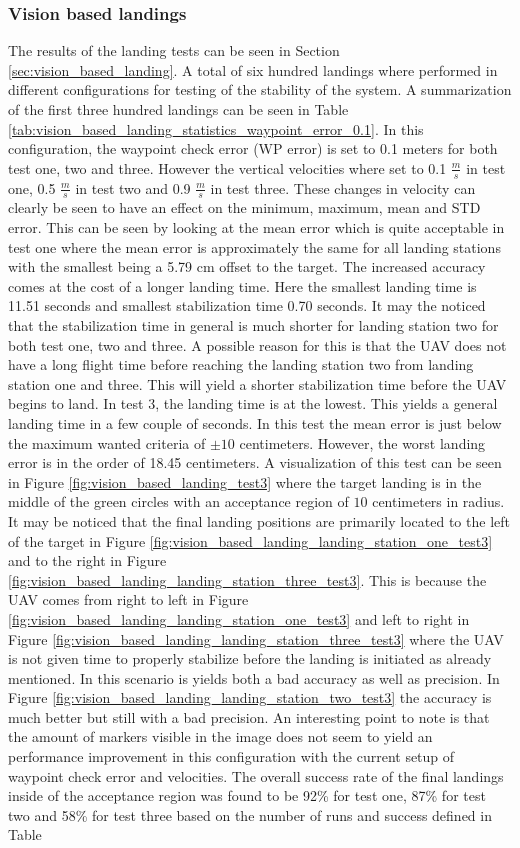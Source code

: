 \documentclass[../Head/report.tex]{subfiles}
\begin{document}
\subsubsection*{Vision based landings}
The results of the landing tests can be seen in Section \ref{sec:vision_based_landing}. A total of six hundred landings where performed in different configurations for testing of the stability of the system. A summarization of the first three hundred landings can be seen in Table \ref{tab:vision_based_landing_statistics_waypoint_error_0.1}. In this configuration, the waypoint check error (WP error) is set to 0.1 meters for both test one, two and three. However the vertical velocities where set to 0.1 $\frac{m}{s}$ in test one, 0.5 $\frac{m}{s}$ in test two and 0.9 $\frac{m}{s}$ in test three. These changes in velocity can clearly be seen to have an effect on the minimum, maximum, mean and STD error. This can be seen by looking at the mean error which is quite acceptable in test one where the mean error is approximately the same for all landing stations with the smallest being a 5.79 cm offset to the target. The increased accuracy comes at the cost of a longer landing time. Here the smallest landing time is 11.51 seconds and smallest stabilization time 0.70 seconds. It may the noticed that the stabilization time in general is much shorter for landing station two for both test one, two and three. A possible reason for this is that the UAV does not have a long flight time before reaching the landing station two from landing station one and three. This will yield a shorter stabilization time before the UAV begins to land. In test 3, the landing time is at the lowest. This yields a general landing time in a few couple of seconds. In this test the mean error is just below the maximum wanted criteria of $\pm 10$ centimeters. However, the worst landing error is in the order of 18.45 centimeters. A visualization of this test can be seen in Figure \ref{fig:vision_based_landing_test3} where the target landing is in the middle of the green circles with an acceptance region of $10$ centimeters in radius. It may be noticed that the final landing positions are primarily located to the left of the target in Figure \ref{fig:vision_based_landing_landing_station_one_test3} and to the right in Figure \ref{fig:vision_based_landing_landing_station_three_test3}. This is because the UAV comes from right to left in Figure \ref{fig:vision_based_landing_landing_station_one_test3} and left to right in Figure \ref{fig:vision_based_landing_landing_station_three_test3} where the UAV is not given time to properly stabilize before the landing is initiated as already mentioned. In this scenario is yields both a bad accuracy as well as precision. In Figure \ref{fig:vision_based_landing_landing_station_two_test3} the accuracy is much better but still with a bad precision. An interesting point to note is that the amount of markers visible in the image does not seem to yield an performance improvement in this configuration with the current setup of waypoint check error and velocities. The overall success rate of the final landings inside of the acceptance region was found to be 92\% for test one, 87\% for test two and 58\% for test three based on the number of runs and success defined in Table 
\end{document}
